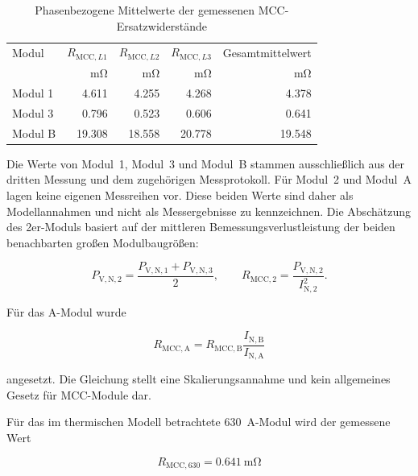 \begin{table}[H]
    \centering
    \caption{Phasenbezogene Mittelwerte der gemessenen
    MCC-Ersatzwiderstände}
    \label{tab:kap5_rmcc_phasenwerte}
    \begin{tabular}{@{}lrrrr@{}}
        \toprule
        Modul & \(R_{\mathrm{MCC},L1}\) & \(R_{\mathrm{MCC},L2}\) &
        \(R_{\mathrm{MCC},L3}\) & Gesamtmittelwert \\
        & \si{\milli\ohm} & \si{\milli\ohm} & \si{\milli\ohm} &
        \si{\milli\ohm} \\
        \midrule
        Modul 1 & \num{4.611} & \num{4.255} & \num{4.268} & \num{4.378} \\
        Modul 3 & \num{0.796} & \num{0.523} & \num{0.606} & \num{0.641} \\
        Modul B & \num{19.308} & \num{18.558} & \num{20.778} & \num{19.548} \\
        \bottomrule
    \end{tabular}
\end{table}

Die Werte von Modul~1, Modul~3 und Modul~B stammen ausschließlich aus der
dritten Messung und dem zugehörigen Messprotokoll. Für Modul~2 und Modul~A
lagen keine eigenen Messreihen vor. Diese beiden Werte sind daher als
Modellannahmen und nicht als Messergebnisse zu kennzeichnen. Die Abschätzung
des 2er-Moduls basiert auf der mittleren Bemessungsverlustleistung der beiden
benachbarten großen Modulbaugrößen:

\begin{equation}
    P_{\mathrm{V,N},2}
    =
    \frac{P_{\mathrm{V,N},1}+P_{\mathrm{V,N},3}}{2},
    \qquad
    R_{\mathrm{MCC},2}
    =
    \frac{P_{\mathrm{V,N},2}}{I_{\mathrm{N},2}^{2}}.
    \label{eq:kap5_rmcc_modul2_abschaetzung}
\end{equation}

Für das A-Modul wurde

\begin{equation}
    R_{\mathrm{MCC,A}}
    =
    R_{\mathrm{MCC,B}}
    \frac{I_{\mathrm{N,B}}}{I_{\mathrm{N,A}}}
    \label{eq:kap5_rmcc_modula_abschaetzung}
\end{equation}

angesetzt. Die Gleichung stellt eine Skalierungsannahme und kein allgemeines
Gesetz für MCC-Module dar.

Für das im thermischen Modell betrachtete \SI{630}{\ampere}-Modul wird der
gemessene Wert

\begin{equation}
    R_{\mathrm{MCC},630}
    =
    \SI{0.641}{\milli\ohm}
    \label{eq:kap5_rmcc_630}
\end{equation}

